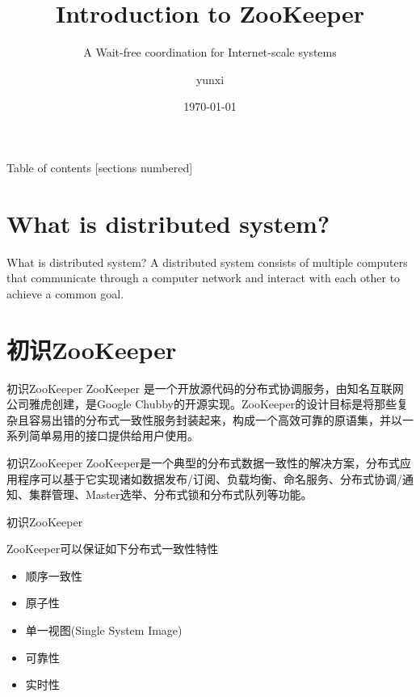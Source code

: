\documentclass[10pt]{beamer}
\title{Introduction to ZooKeeper}
\subtitle{A Wait-free coordination for Internet-scale systems}
\date{\today}
\author{yunxi}
\institute{Computer Science of SCNU}
\begin{document}
\maketitle
\begin{frame}{Table of contents}
  [sections numbered]
  \tableofcontents[hideallsubsections]
\end{frame}
\section{What is distributed system?}

\begin{frame}[fragile]{What is distributed system?}
     A distributed system consists of multiple computers that communicate through a computer network and interact with each other to achieve a common goal.\newline \newline
\end{frame}
\section{初识ZooKeeper}

\begin{frame}[fragile]{初识ZooKeeper}
  ZooKeeper 是一个开放源代码的分布式协调服务，由知名互联网公司雅虎创建，是Google Chubby的开源实现。ZooKeeper的设计目标是将那些复杂且容易出错的分布式一致性服务封装起来，构成一个高效可靠的原语集，并以一系列简单易用的接口提供给用户使用。
\end{frame}

\begin{frame}[fragile]{初识ZooKeeper}
  ZooKeeper是一个典型的分布式数据一致性的解决方案，分布式应用程序可以基于它实现诸如数据发布/订阅、负载均衡、命名服务、分布式协调/通知、集群管理、Master选举、分布式锁和分布式队列等功能。
\end{frame}

\begin{frame}[fragile]{初识ZooKeeper}
  \begin{alertblock}{ZooKeeper可以保证如下分布式一致性特性}
    \newline
    \begin{itemize}
      \item 顺序一致性
      \item 原子性
      \item 单一视图(Single System Image)
      \item 可靠性
      \item 实时性
    \end{itemize}
  \end{alertblock}
\end{frame}
\end{document}
